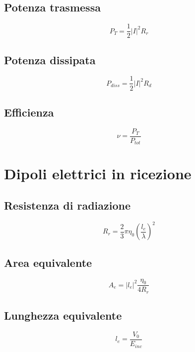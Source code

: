 		\subsection{Potenza trasmessa}

	  \begin{equation}
	  P_T=\frac{1}{2}|I|^2R_r
	  \end{equation}

	  	\subsection{Potenza dissipata}

	  \begin{equation}
	  P_{diss}=\frac{1}{2}|I|^2R_d
	  \end{equation}

	  \subsection{Efficienza}

	  	\begin{equation}
		\nu=\frac{P_{T}}{P_{tot}}
	  	\end{equation}


		\section{Dipoli elettrici in ricezione}

			\subsection{Resistenza di radiazione}			
				\begin{equation}
				R_r=\frac{2}{3}\pi\eta_0(\frac{l_e}{\lambda})^2
				\end{equation}

			\subsection{Area equivalente}			
				\begin{equation}
				A_e=|l_e|^2\frac{\eta_0}{4R_r}
				\end{equation}

			\subsection{Lunghezza equivalente}			
				\begin{equation}
				l_e=\frac{V_0}{E_{inc}}
				\label{eq:lunghezza-equivalente}
				\end{equation}

